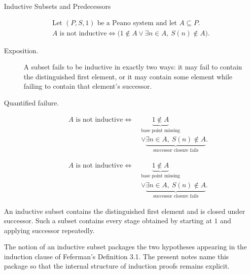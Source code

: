 \begin{topicbox}{Inductive Subsets and Predecessors}
\begin{remark*}
\[
\begin{aligned}
&\text{Let } (P,S,1) \text{ be a Peano system and let } A \subseteq P.\\
&A \text{ is not inductive}
\Longleftrightarrow
\bigl(1 \notin A \lor \exists n \in A,\ S(n) \notin A\bigr).
\end{aligned}
\]
\end{remark*}

\begin{remark*}
\begin{description}
  \item[Exposition.]
  A subset fails to be inductive in exactly two ways: it may fail to contain
  the distinguished first element, or it may contain some element while
  failing to contain that element's successor.
  \item[Quantified failure.]
  \[
  \begin{aligned}
  A \text{ is not inductive}
  \Longleftrightarrow\;&
  \underbrace{1 \notin A}_{\text{base point missing}}\\
  &\lor
  \underbrace{\exists n \in A,\ S(n) \notin A}_{\text{successor closure fails}}.
  \end{aligned}
  \]

\[
  \begin{aligned}
  A \text{ is not inductive}
  \Longleftrightarrow\;&
  \underbrace{1 \notin A}_{\text{base point missing}}\\
  &\lor
  \underbrace{\exists n \in A,\ S(n) \notin A}_{\text{successor closure fails}}.
  \end{aligned}
  \]
\end{description}
\end{remark*}

\begin{remark*}[Interpretation]
An inductive subset contains the distinguished first element and is closed
under successor. Such a subset contains every stage obtained by starting at
$1$ and applying successor repeatedly.
\end{remark*}

\begin{remark*}
The notion of an inductive subset packages the two hypotheses appearing in the
induction clause of Feferman's Definition 3.1. The present notes name this
package so that the internal structure of induction proofs remains explicit.
\citep{FefermanNumberSystems1964}
\end{remark*}


\end{topicbox}
